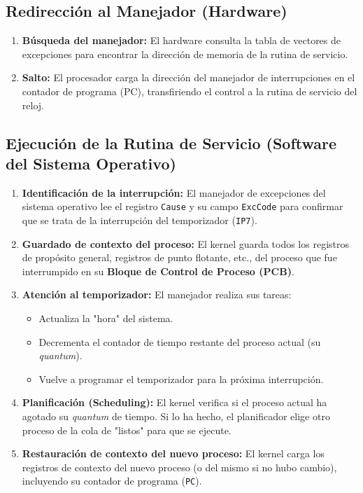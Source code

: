 \documentclass{article}
\begin{document}
{{\subsection{ Redirección al Manejador (Hardware)}
\begin{enumerate}
    \item \textbf{Búsqueda del manejador:} El hardware consulta la tabla de vectores de excepciones para encontrar la dirección de memoria de la rutina de servicio.
    \item \textbf{Salto:} El procesador carga la dirección del manejador de interrupciones en el contador de programa (PC), transfiriendo el control a la rutina de servicio del reloj.
\end{enumerate}

\subsection{ Ejecución de la Rutina de Servicio (Software del Sistema Operativo)}
\begin{enumerate}
    \item \textbf{Identificación de la interrupción:} El manejador de excepciones del sistema operativo lee el registro \texttt{Cause} y su campo \texttt{ExcCode} para confirmar que se trata de la interrupción del temporizador (\texttt{IP7}).
    \item \textbf{Guardado de contexto del proceso:} El kernel guarda todos los registros de propósito general, registros de punto flotante, etc., del proceso que fue interrumpido en su \textbf{Bloque de Control de Proceso (PCB)}.
    \item \textbf{Atención al temporizador:} El manejador realiza sus tareas:
    \begin{itemize}
        \item Actualiza la "hora" del sistema.
        \item Decrementa el contador de tiempo restante del proceso actual (su \textit{quantum}).
        \item Vuelve a programar el temporizador para la próxima interrupción.
    \end{itemize}
    \item \textbf{Planificación (Scheduling):} El kernel verifica si el proceso actual ha agotado su \textit{quantum} de tiempo. Si lo ha hecho, el planificador elige otro proceso de la cola de "listos" para que se ejecute.
    \item \textbf{Restauración de contexto del nuevo proceso:} El kernel carga los registros de contexto del nuevo proceso (o del mismo si no hubo cambio), incluyendo su contador de programa (\texttt{PC}).
\end{enumerate}

}}
\end{document}
